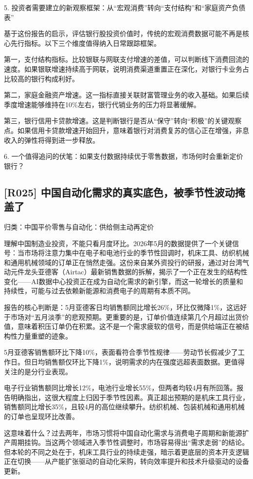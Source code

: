 \documentclass[11pt]{ctexart}
\begin{document}
5. 投资者需要建立的新观察框架：从“宏观消费”转向“支付结构”和“家庭资产负债表”

基于这份报告的启示，评估银行股投资价值时，传统的宏观消费数据可能不再是核心先行指标。以下三个维度值得纳入日常跟踪框架。

第一，支付结构指标。比较银联与网联支付增速的差值，可以判断线下消费回流的速度。如果银联增速持续高于网联，说明消费渠道重置正在深化，对银行卡业务占比较高的银行构成利好。

第二，家庭金融资产增速。这一指标直接关联财富管理业务的收入基础。如果后续季度增速能够维持在10\%左右，银行代销业务的压力将显著缓解。

第三，银行信用卡贷款增速。这是判断银行是否从“保守”转向“积极”的关键观察点。如果信用卡贷款增速开始回升，意味着银行对消费复苏的信心正在增强，非息收入的弹性将得到进一步释放。

6. 一个值得追问的伏笔：如果支付数据持续优于零售数据，市场何时会重新定价银行？

\subsection{[R025] 中国自动化需求的真实底色，被季节性波动掩盖了}
{\small\color{refgray}归类：中国平价零售与自动化：供给侧主动再定价}

理解中国制造业投资，不能只看月度环比。2026年5月的数据提供了一个关键信号：当市场将注意力集中在电子和电池行业的季节性回调时，机床工具、纺织机械和通用机械领域的订单正在悄然走强。这份来自某外资投行的研报，通过对台湾气动元件龙头亚德客（Airtac）最新销售数据的拆解，揭示了一个正在发生的结构性变化——AI数据中心投资正在成为自动化需求的新引擎，而这一轮增长的质量和持续性，可能与过去依赖新能源和消费电子的周期有本质不同。

报告的核心判断是：5月亚德客日均销售额同比增长26\%，环比仅微降1\%，这远好于市场对“五月淡季”的悲观预期。更重要的是，订单价值连续第几个月超过出货价值，意味着积压订单仍在积累。这不是一个需求疲软的信号，而是供给端正在被结构性力量重塑的迹象。

5月亚德客销售额环比下降10\%，表面看符合季节性规律——劳动节长假减少了工作日。但日均销售额仅环比下降1\%，说明需求的内在强度远超表面数据。更值得关注的是分行业表现。

电子行业销售额同比增长12\%，电池行业增长55\%，但两者均较4月有所回落。报告明确指出，这很大程度上归因于季节性因素。真正超出预期的是机床工具行业，销售额同比增长35\%，且较4月的高位继续攀升。纺织机械、包装机械和通用机械的订单也呈现环比改善。

这意味着什么？过去两年，市场习惯将中国自动化需求与消费电子周期和新能源扩产周期挂钩。当这两个领域进入季节性调整时，市场容易得出“需求走弱”的结论。但本轮的不同之处在于，机床工具行业的持续走强，暗示着更底层的资本开支逻辑正在切换——从产能扩张驱动的自动化采购，转向效率提升和技术升级驱动的设备更新。
\end{document}
